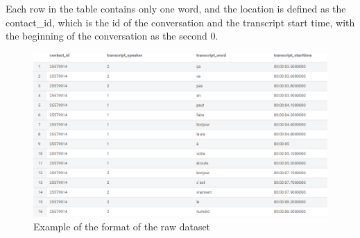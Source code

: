 Each row in the table contains only one word, and the location is defined as the contact\_id, which is the id of the conversation and the transcript start time, with the beginning of the conversation as the second 0.

\begin{figure}[H]
    \centering
    \includegraphics[width=1\textwidth]{images/db_example.png}
    \caption{Example of the format of the raw dataset}
    \label{fig:raw_dataset}
\end{figure}







